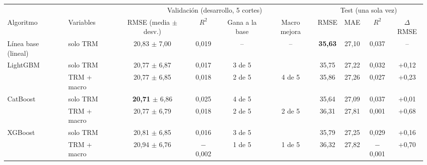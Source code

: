 \begin{tabular}{llcccc|cccc}
\toprule
 & & \multicolumn{4}{c|}{Validación (desarrollo, 5 cortes)} & \multicolumn{4}{c}{Test (una sola vez)} \\
\cmidrule(lr){3-6}\cmidrule(lr){7-10}
Algoritmo & Variables & RMSE (media $\pm$ desv.) & $R^2$ & Gana a la base & Macro mejora & RMSE & MAE & $R^2$ & $\Delta$RMSE \\
\midrule
Línea base (lineal) & solo TRM & 20,83 $\pm$ 7,00 & 0,019 & -- & -- & \textbf{35,63} & 27,10 & 0,037 & -- \\
\addlinespace[2pt]
LightGBM & solo TRM & 20,77 $\pm$ 6,87 & 0,017 & 3 de 5 &  & 35,75 & 27,22 & 0,032 & +0,12 \\
 & TRM + macro & 20,77 $\pm$ 6,85 & 0,018 & 2 de 5 & 4 de 5 & 35,86 & 27,26 & 0,027 & +0,23 \\
\addlinespace[2pt]
CatBoost & solo TRM & \textbf{20,71} $\pm$ 6,86 & 0,025 & 4 de 5 &  & 35,64 & 27,09 & 0,037 & +0,01 \\
 & TRM + macro & 20,77 $\pm$ 6,79 & 0,018 & 2 de 5 & 2 de 5 & 36,31 & 27,81 & 0,001 & +0,68 \\
\addlinespace[2pt]
XGBoost & solo TRM & 20,81 $\pm$ 6,85 & 0,016 & 3 de 5 &  & 35,79 & 27,25 & 0,029 & +0,16 \\
 & TRM + macro & 20,94 $\pm$ 6,76 & $-$0,002 & 1 de 5 & 1 de 5 & 36,32 & 27,82 & $-$0,001 & +0,70 \\
\bottomrule
\end{tabular}
